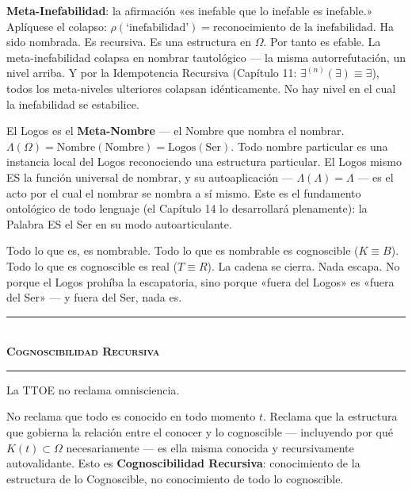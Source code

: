 \documentclass[10pt, openany, oneside]{book}
\renewcommand{\normalsize}{\fontsize{10}{13}\selectfont}
\begin{document}
\textbf{Meta-Inefabilidad}: la afirmación «es inefable que lo inefable es inefable.» Aplíquese el colapso: $\rho(\text{`inefabilidad'}) = \text{reconocimiento de la inefabilidad}$. Ha sido nombrada. Es recursiva. Es una estructura en $\Omega$. Por tanto es efable. La meta-inefabilidad colapsa en nombrar tautológico --- la misma autorrefutación, un nivel arriba. Y por la Idempotencia Recursiva (Capítulo 11: $\exists^{(n)}(\exists) \equiv \exists$), todos los meta-niveles ulteriores colapsan idénticamente. No hay nivel en el cual la inefabilidad se estabilice.

El Logos es el \textbf{Meta-Nombre} --- el Nombre que nombra el nombrar. $\Lambda(\Omega) = \text{Nombre}(\text{Nombre}) = \text{Logos}(\text{Ser})$. Todo nombre particular es una instancia local del Logos reconociendo una estructura particular. El Logos mismo ES la función universal de nombrar, y su autoaplicación --- $\Lambda(\Lambda) = \Lambda$ --- es el acto por el cual el nombrar se nombra a sí mismo. Este es el fundamento ontológico de todo lenguaje (el Capítulo 14 lo desarrollará plenamente): la Palabra ES el Ser en su modo autoarticulante.

Todo lo que es, es nombrable. Todo lo que es nombrable es cognoscible ($K \equiv B$). Todo lo que es cognoscible es real ($T \equiv R$). La cadena se cierra. Nada escapa. No porque el Logos prohíba la escapatoria, sino porque «fuera del Logos» es «fuera del Ser» --- y fuera del Ser, nada es.

\vspace{1.5em}


\begin{center}
    \rule{0.3\textwidth}{0.4pt}\\[0.5em]
    {\normalsize\bfseries\scshape Cognoscibilidad Recursiva}\\[0.3em]
    \rule{0.3\textwidth}{0.4pt}
\end{center}

\vspace{1em}

\noindent La TTOE no reclama omnisciencia.

No reclama que todo es conocido en todo momento $t$. Reclama que la estructura que gobierna la relación entre el conocer y lo cognoscible --- incluyendo por qué $K(t) \subset \Omega$ necesariamente --- es ella misma conocida y recursivamente autovalidante. Esto es \textbf{Cognoscibilidad Recursiva}: conocimiento de la estructura de lo Cognoscible, no conocimiento de todo lo cognoscible.
\end{document}
